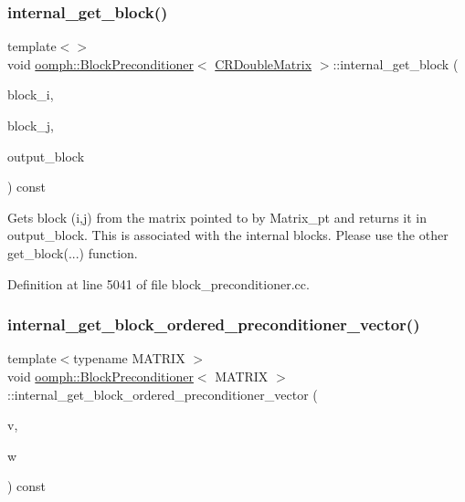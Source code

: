 \subsubsection{\texorpdfstring{internal\+\_\+get\+\_\+block()}{internal\_get\_block()}\hspace{0.1cm}{\footnotesize\ttfamily [2/2]}}
{\footnotesize\ttfamily template$<$$>$ \\
void \hyperlink{classoomph_1_1BlockPreconditioner}{oomph\+::\+Block\+Preconditioner}$<$ \hyperlink{classoomph_1_1CRDoubleMatrix}{C\+R\+Double\+Matrix} $>$\+::internal\+\_\+get\+\_\+block (\begin{DoxyParamCaption}\item[{const unsigned \&}]{block\+\_\+i,  }\item[{const unsigned \&}]{block\+\_\+j,  }\item[{\hyperlink{classoomph_1_1CRDoubleMatrix}{C\+R\+Double\+Matrix} \&}]{output\+\_\+block }\end{DoxyParamCaption}) const}



Gets block (i,j) from the matrix pointed to by Matrix\+\_\+pt and returns it in output\+\_\+block. This is associated with the internal blocks. Please use the other get\+\_\+block(...) function. 



Definition at line 5041 of file block\+\_\+preconditioner.\+cc.

\mbox{\label{classoomph_1_1BlockPreconditioner_afba1bef13cebdce65a0a49ff3381269a}} 
\subsubsection{\texorpdfstring{internal\+\_\+get\+\_\+block\+\_\+ordered\+\_\+preconditioner\+\_\+vector()}{internal\_get\_block\_ordered\_preconditioner\_vector()}}
{\footnotesize\ttfamily template$<$typename M\+A\+T\+R\+IX $>$ \\
void \hyperlink{classoomph_1_1BlockPreconditioner}{oomph\+::\+Block\+Preconditioner}$<$ M\+A\+T\+R\+IX $>$\+::internal\+\_\+get\+\_\+block\+\_\+ordered\+\_\+preconditioner\+\_\+vector (\begin{DoxyParamCaption}\item[{const \hyperlink{classoomph_1_1DoubleVector}{Double\+Vector} \&}]{v,  }\item[{\hyperlink{classoomph_1_1DoubleVector}{Double\+Vector} \&}]{w }\end{DoxyParamCaption}) const}



